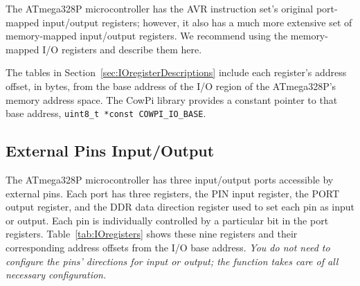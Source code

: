 The ATmega328P microcontroller has the AVR instruction set's original port-mapped input/output registers;
however, it also has a much more extensive set of memory-mapped input/output registers.
We recommend using the memory-mapped I/O registers and describe them here.

The tables in Section~\ref{sec:IOregisterDescriptions} include each register's address offset, in bytes, from the base address of the I/O region of the ATmega328P's memory address space.
The CowPi library provides a constant pointer to that base address, \lstinline{uint8_t *const COWPI_IO_BASE}.

\subsection{External Pins Input/Output}

The ATmega328P microcontroller has three input/output ports accessible by external pins.
Each port has three registers, the PIN input register, the PORT output register, and the DDR data direction register used to set each pin as input or output.
Each pin is individually controlled by a particular bit in the port registers.
Table~\ref{tab:IOregisters} shows these nine registers and their corresponding address offsets from the I/O base address.
\textit{You do not need to configure the pins' directions for input or output;
the  function takes care of all necessary configuration.}

